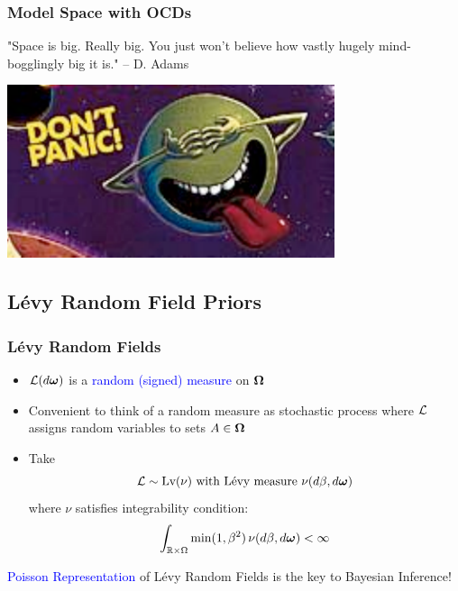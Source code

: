 \documentclass[dvips]{beamer}
\newcommand{\bs}[2]{\begin{frame} \frametitle{#1} 
{#2}
\end{frame} }
\newcommand{\blue}{\textcolor{Blue}}
\begin{document}
\bs{Model Space with OCDs}{
"Space is big. Really big. You just won't believe how vastly hugely
mind-bogglingly big it is."  -- D. Adams

\vspace{.25in}
\centerline{\includegraphics[height=2in]{dont-panic}}
}

\subsection{L\'evy Random Field Priors }

\bs{ L\'evy  Random Fields} {
  \begin{itemize}
  \item 
${\cal L}(d\bm \omega)$  is a \blue{random (signed) measure} on $\bm \Omega$ 

\item Convenient to think of a random measure as stochastic process where
${\cal L}$ assigns random variables  to sets $A \in \bm \Omega$

\item Take
$${\cal L} \sim \mbox{\rm Lv}(\nu) \text{ with L\'evy measure } \nu(d \beta, d
  \bm \omega)$$
where $\nu$ satisfies integrability condition:
$$\int_{\mathbb{R} \times \Omega} \min(1, \beta^2) \, \nu(d\beta, d
  \bm \omega) < \infty$$
  \end{itemize}

\blue{Poisson Representation} of L\'evy Random Fields is the key to
Bayesian Inference!
}
\end{document}

